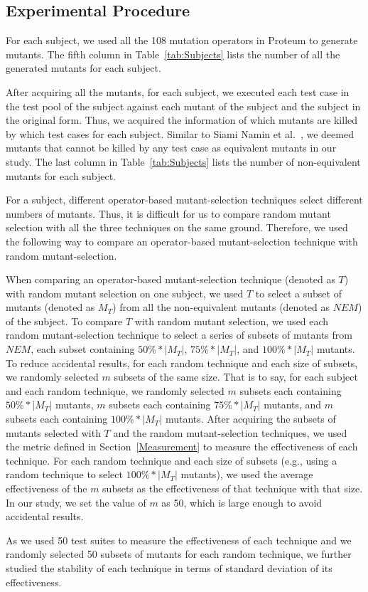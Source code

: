 \vspace{-1ex}
\subsection{Experimental Procedure}
\label{Procedure}

For each subject, we used all the 108 mutation operators in
Proteum to generate mutants. The fifth column in
Table~\ref{tab:Subjects} lists the number of all the generated
mutants for each subject.

After acquiring all the mutants, for each subject, we executed
each test case in the test pool of the subject against each mutant
of the subject and the subject in the original form. Thus, we
acquired the information of which mutants are killed by which test
cases for each subject. Similar to Siami Namin et
al.~\cite{SiamiNamin:08}, we deemed mutants that cannot be killed
by any test case as equivalent mutants in our study. The last
column in Table~\ref{tab:Subjects} lists the number of
non-equivalent mutants for each subject.

For a subject, different operator-based mutant-selection
techniques select different numbers of mutants. Thus, it is
difficult for us to compare random mutant selection with all the
three techniques on the same ground. Therefore, we used the
following way to compare an operator-based mutant-selection
technique with random mutant-selection.

When comparing an operator-based mutant-selection technique
(denoted as $T$) with random mutant selection on one subject, we
used $T$ to select a subset of mutants (denoted as $M_T$) from all
the non-equivalent mutants (denoted as $NEM$) of the subject. To
compare $T$ with random mutant selection, we used each random
mutant-selection technique to select a series of subsets of
mutants from $NEM$, each subset containing $50\%*|M_T|$,
$75\%*|M_T|$, and $100\%*|M_T|$ mutants. To reduce accidental
results, for each random technique and each size of subsets, we
randomly selected $m$ subsets of the same size. That is to say,
for each subject and each random technique, we randomly selected
$m$ subsets each containing $50\%*|M_T|$ mutants, $m$ subsets each
containing $75\%*|M_T|$ mutants, and $m$ subsets each containing
$100\%*|M_T|$ mutants. After acquiring the subsets of mutants
selected with $T$ and the random mutant-selection techniques, we
used the metric defined in Section~\ref{Measurement} to measure
the effectiveness of each technique. For each random technique and
each size of subsets (e.g., using a random technique to select
$100\%*|M_T|$ mutants), we used the average effectiveness of the
$m$ subsets as the effectiveness of that technique with that size.
In our study, we set the value of $m$ as 50, which is large enough
to avoid accidental results.

As we used 50 test suites to measure the effectiveness of each
technique and we randomly selected 50 subsets of mutants for each
random technique, we further studied the stability of each
technique in terms of standard deviation of its effectiveness.
